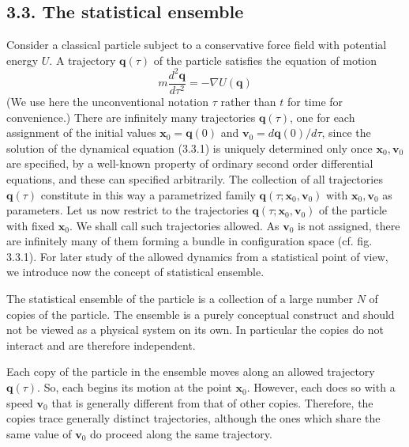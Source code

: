 \documentclass{article}
\begin{document}
\subsection*{3.3. The statistical ensemble}

Consider a classical particle subject to a conservative force field with potential energy $U$. A trajectory $\boldsymbol{q}(\tau)$ of the particle satisfies the equation of motion
$$
\begin{equation*}
m \frac{d^{2} \boldsymbol{q}}{d \tau^{2}}=-\nabla U(\boldsymbol{q}) \tag{3.3.1}
\end{equation*}
$$
(We use here the unconventional notation $\tau$ rather than $t$ for time for convenience.) There are infinitely many trajectories $\boldsymbol{q}(\tau)$, one for each assignment of the initial values $\boldsymbol{x}_{0}=\boldsymbol{q}(0)$ and $\boldsymbol{v}_{0}=d \boldsymbol{q}(0) / d \tau$, since the solution of the dynamical equation (3.3.1) is uniquely determined only once $\boldsymbol{x}_{0}, \boldsymbol{v}_{0}$ are specified, by a well-known property of ordinary second order differential equations, and these can specified arbitrarily. The collection of all trajectories $\boldsymbol{q}(\tau)$ constitute in this way a parametrized family $\boldsymbol{q}\left(\tau ; \boldsymbol{x}_{0}, \boldsymbol{v}_{0}\right)$ with $\boldsymbol{x}_{0}, \boldsymbol{v}_{0}$ as parameters. Let us now restrict to the trajectories $\boldsymbol{q}\left(\tau ; \boldsymbol{x}_{0}, \boldsymbol{v}_{0}\right)$ of the particle with fixed $\boldsymbol{x}_{0}$. We shall call such trajectories allowed. As $\boldsymbol{v}_{0}$ is not assigned, there are infinitely many of them forming a bundle in configuration space (cf. fig. 3.3.1). For later study of the allowed dynamics from a statistical point of view, we introduce now the concept of statistical ensemble.

The statistical ensemble of the particle is a collection of a large number $N$ of copies of the particle. The ensemble is a purely conceptual construct and should not be viewed as a physical system on its own. In particular the copies do not interact and are therefore independent.

Each copy of the particle in the ensemble moves along an allowed trajectory $\boldsymbol{q}(\tau)$. So, each begins its motion at the point $\boldsymbol{x}_{0}$. However, each does so with a speed $\boldsymbol{v}_{0}$ that is generally different from that of other copies. Therefore, the copies trace generally distinct trajectories, although the ones which share the same value of $\boldsymbol{v}_{0}$ do proceed along the same trajectory.
\end{document}
